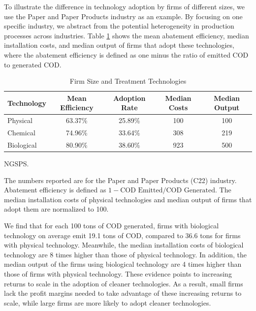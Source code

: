 \documentclass[AEJ]{AEA}
\begin{document}
To illustrate the difference in technology adoption by firms of different sizes, we use the Paper and Paper Products industry as an example. By focusing on one specific industry, we abstract from the potential heterogeneity in production processes across industries. Table \ref{tab:techeffi} shows the mean abatement efficiency, median installation costs, and median output of firms that adopt these technologies, where the {abatement efficiency} is defined as one minus the ratio of {emitted COD} to {generated COD}.
\begin{table}[t]
\footnotesize
\centering
\caption{Firm Size and Treatment Technologies}
\begin{tabular}{lcccc}
    \hline \hline
    Technology  & Mean Efficiency & Adoption Rate & Median Costs & Median Output \\
    \hline
    Physical    & 63.37\%         & 25.89\%       & 100          & 100                       \\
    Chemical    & 74.96\%         & 33.64\%       & 308          & 219                       \\
    Biological  & 80.90\%         & 38.60\%       & 923          & 500                       \\
    \hline
\end{tabular}
\label{tab:techeffi}
\begin{tablenotes}[Source]
     NGSPS.
\end{tablenotes}
\begin{tablenotes}
     The numbers reported are for the Paper and Paper Products (C22) industry. Abatement efficiency is defined as $1 - \text{COD Emitted}/\text{COD Generated}$. The median installation costs of physical technologies and median output of firms that adopt them are normalized to 100.
\end{tablenotes}
\end{table}
We find that for each 100 tons of COD generated, firms with biological technology on average emit 19.1 tons of COD, compared to 36.6 tons for firms with physical technology. Meanwhile, the median installation costs of biological technology are 8 times higher than those of physical technology. In addition, the median output of the firms using biological technology are 4 times higher than those of firms with physical technology. These evidence points to increasing returns to scale in the adoption of cleaner technologies. As a result, small firms lack the profit margins needed to take advantage of these increasing returns to scale, while large firms are more likely to adopt cleaner technologies.
\end{document}
